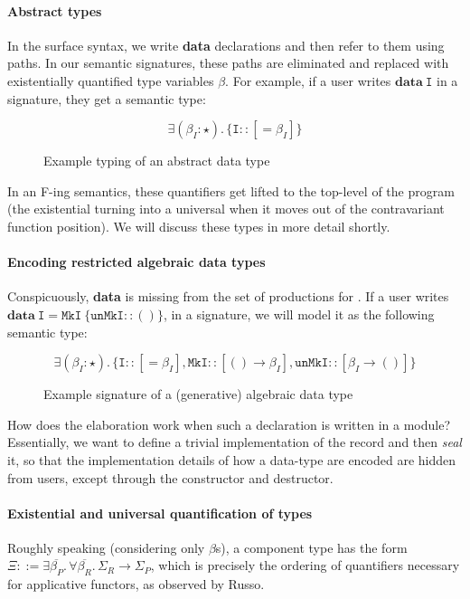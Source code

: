 \documentclass{article}
\begin{document}
\paragraph{Abstract types}
In the surface syntax, we write \textbf{data} declarations and then refer
to them using paths.  In our semantic signatures, these paths are eliminated
and replaced with existentially quantified type variables $\beta$.
For example, if a user writes $\mathbf{data}~\texttt{I}$ in a signature, they get
a semantic type:

\begin{figure}[H]
\[
\exists (\beta_I : \star).\, \{ \mathtt{I} :: [ = \beta_I ] \}
\]
\caption{Example typing of an abstract data type}
\end{figure}

\noindent
In an F-ing semantics, these quantifiers get lifted to the top-level of
the program (the existential turning into a universal when it moves
out of the contravariant function position).
We will discuss these types in more detail shortly.

\paragraph{Encoding restricted algebraic data types}  Conspicuously, \textbf{data} is missing
from the set of productions for .  If a user writes
$\mathbf{data}~\mathtt{I} = \mathtt{MkI}~\{ \mathtt{unMkI} :: () \}$,
in a signature, we will model it as the following semantic type:

\begin{figure}[H]
\[
\exists (\beta_I : \star).\,
\{
\mathtt{I} :: [= \beta_I],
\mathtt{MkI} :: [() \rightarrow \beta_I],
\mathtt{unMkI} :: [\beta_I \rightarrow ()]
\}
\]
\caption{Example signature of a (generative) algebraic data type}
\end{figure}

\noindent
How does the elaboration work when such a declaration is written
in a module?  Essentially, we want to define a trivial implementation
of the record and then \emph{seal} it, so that the implementation details
of how a data-type are encoded are hidden from users, except through the
constructor and destructor.

\paragraph{Existential and universal quantification of types}
Roughly speaking (considering only $\beta$s), a component type
has the form $\Xi ::= \exists \overline{\beta_P}.\, \forall \overline{\beta_R}.\, \Sigma_R \rightarrow \Sigma_P$, which is precisely the ordering of quantifiers necessary
for applicative functors, as observed by Russo.
\end{document}
